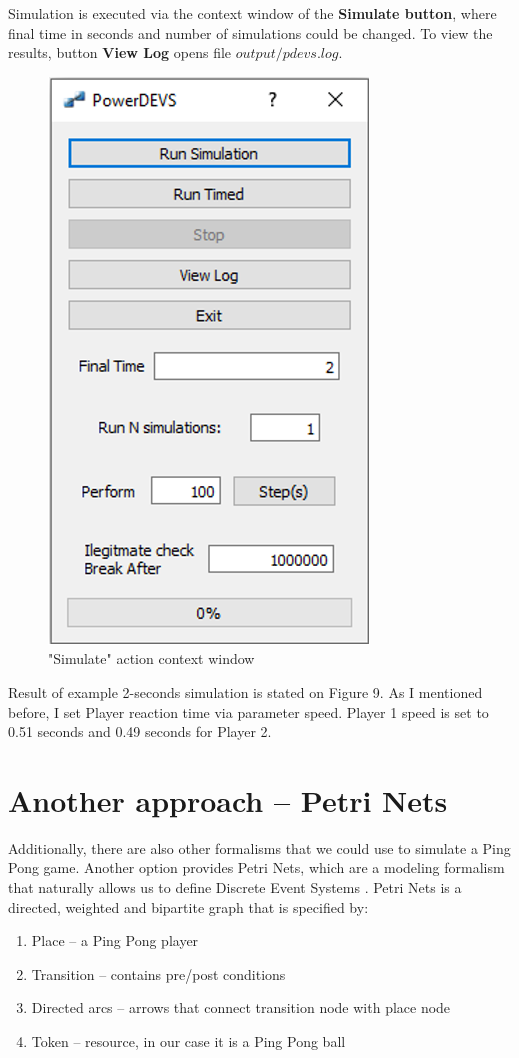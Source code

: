\documentclass[fleqn,10pt]{olplainarticle}
\begin{document}
Simulation is executed via the context window of the \textbf{Simulate button}, where final time in seconds and number of simulations could be changed. To view the results, button \textbf{View Log} opens file $output/pdevs.log$.

\begin{figure}[ht]
    \centering
    \includegraphics[width=0.35\linewidth]{images/7-simulation.png}
    \caption{"Simulate" action context window}
    \label{fig:figure5}
\end{figure}

\pagebreak

\noindent Result of example 2-seconds simulation is stated on Figure 9. As I mentioned before, I set Player reaction time via parameter speed. Player 1 speed is set to 0.51 seconds and 0.49 seconds for Player 2.



\pagebreak

\section{Another approach – Petri Nets}

Additionally, there are also other formalisms that we could use to simulate a Ping Pong game.  Another option provides Petri Nets, which are a modeling formalism that naturally allows us to define Discrete Event Systems \cite{DeLaMotaIdaliaFlores2017RMaS}. Petri Nets is a directed, weighted and bipartite graph that is specified by:

\begin{enumerate}
    \item Place – a Ping Pong player
    \item Transition – contains pre/post conditions
    \item Directed arcs – arrows that connect transition node with place node
    \item Token – resource, in our case it is a Ping Pong ball
\end{enumerate}
\end{document}
